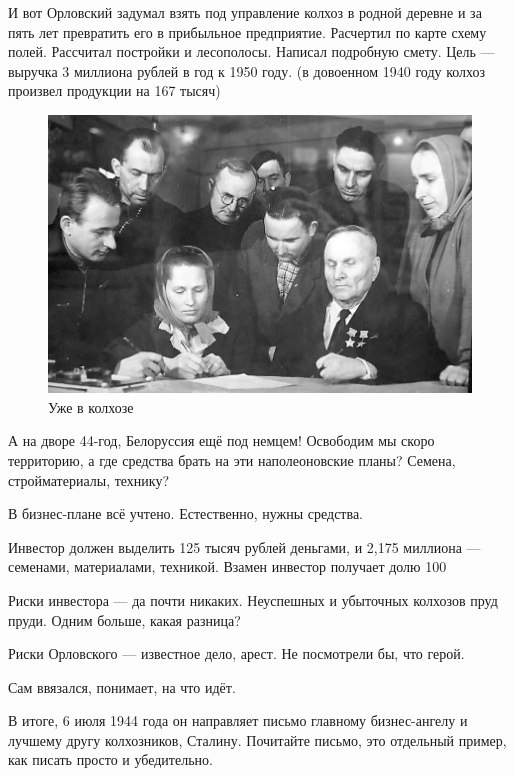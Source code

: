 И вот Орловский задумал взять под управление колхоз в родной деревне и за пять лет превратить его в прибыльное предприятие. Расчертил по карте схему полей. Рассчитал постройки и лесополосы. Написал подробную смету.
Цель — выручка 3 миллиона рублей в год к 1950 году.
(в довоенном 1940 году колхоз произвел продукции на 167 тысяч)
\begin{figure}[h!tb] 
	\centering\includegraphics[scale=0.4]{Orlovskiy/Af8WSw9knQM.jpg}
	\caption{Уже в колхозе}%
\end{figure}
А на дворе 44-год, Белоруссия ещё под немцем!
Освободим мы скоро территорию, а где средства брать на эти наполеоновские планы? Семена, стройматериалы, технику?

В бизнес-плане всё учтено.
Естественно, нужны средства.

Инвестор должен выделить 125 тысяч рублей деньгами, и 2,175 миллиона — семенами, материалами, техникой.
Взамен инвестор получает долю 100%

Риски инвестора — да почти никаких. Неуспешных и убыточных колхозов пруд пруди. Одним больше, какая разница?

Риски Орловского — известное дело, арест. Не посмотрели бы, что герой.

Сам ввязался, понимает, на что идёт.

В итоге, 6 июля 1944 года он направляет письмо главному бизнес-ангелу и лучшему другу колхозников, Сталину.
Почитайте письмо, это отдельный пример, как писать просто и убедительно.

